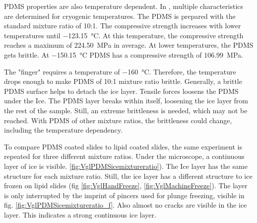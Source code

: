 PDMS properties are also temperature dependent. In \cite{Zhang.2020}, multiple characteristics are determined for cryogenic temperatures. The PDMS is prepared with the standard mixture ratio of 10:1. The compressive strength increases with lower temperatures until \SI{-123.15}{\degreeCelsius}. At this temperature, the compressive strength reaches a maximum of \SI{224.50}{\mega\pascal} in average. At lower temperatures, the PDMS gets brittle. At \SI{-150.15}{\degreeCelsius} PDMS has a compressive strength of \SI{106.99}{\mega\pascal}.

The "finger" requires a temperature of \SI{-160}{\degreeCelsius}. Therefore, the temperature drops enough to make PDMS of 10:1 mixture ratio brittle. Generally, a brittle PDMS surface helps to detach the ice layer. Tensile forces loosens the PDMS under the Ice. The PDMS layer breaks within itself, loosening the ice layer from the rest of the sample. Still, an extreme brittleness is needed, which may not be reached. With PDMS of other mixture ratios, the brittleness could change, including the temperature dependency.

To compare PDMS coated slides to lipid coated slides, the same experiment is repeated for three different mixture ratios. Under the microscope, a continuous layer of ice is visible. \ref{fig:VglPDMSicemixtureratio}). The Ice layer has the same structure for each mixture ratio. Still, the ice layer has a different structure to ice frozen on lipid slides (fig \ref{fig:VglHandFreeze}, \ref{fig:VglMachineFreeze}). The layer is only interrupted by the imprint of pincers used for plunge freezing, visible in fig. \ref{fig:VglPDMSicemixtureratio_f}. Also almost no cracks are visible in the ice layer. This indicates a strong continuous ice layer.

